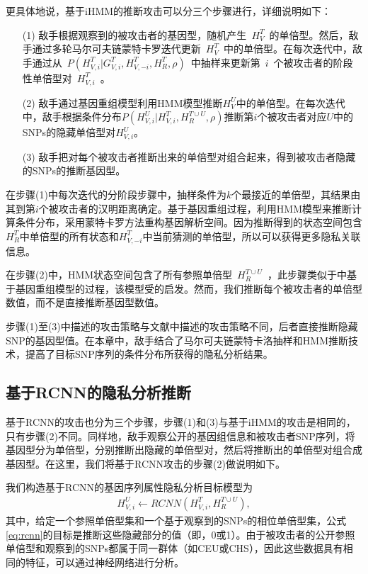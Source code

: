 更具体地说，基于iHMM的推断攻击可以分三个步骤进行，详细说明如下：
\begin{enumerate}
	\item[(1)] 敌手根据观察到的被攻击者的基因型，随机产生~$H_V^T$~的单倍型。然后，敌手通过多轮马尔可夫链蒙特卡罗迭代更新~$H_V^T$~中的单倍型。在每次迭代中，敌手通过从~$P(H_{V,i}^T|G_{V,i}^T,H_{V,-i}^T,H_R^T,\rho)$~中抽样来更新第~$i$~个被攻击者的阶段性单倍型对~$H_{V,i}^T$~。
	\item[(2)] 敌手通过基因重组模型利用HMM模型推断$H_V^U$中的单倍型。在每次迭代中，敌手根据条件分布$P(H_{V,i}^U|H_{V,i}^T, H_R^{T \cup U},\rho)$推断第$i$个被攻击者对应$U$中的SNPs的隐藏单倍型对$H_{V,i}^U$。 
	\item[(3)] 敌手把对每个被攻击者推断出来的单倍型对组合起来，得到被攻击者隐藏的SNPs的推断基因型。
\end{enumerate}

在步骤(1)中每次迭代的分阶段步骤中，抽样条件为$k$个最接近的单倍型，其结果由其到第$i$个被攻击者的汉明距离确定。基于基因重组过程，利用HMM模型来推断计算条件分布，采用蒙特卡罗方法重构基因解析空间。因为推断得到的状态空间包含$H_R^T$中单倍型的所有状态和$H_{V,-i}^T$中当前猜测的单倍型，所以可以获得更多隐私关联信息。

在步骤(2)中，HMM状态空间包含了所有参照单倍型~$H_R^{T \cup U}$~，此步骤类似于\cite{samani2015quantifying}中基于基因重组模型的过程，该模型受\cite{marchini2007new}的启发。然而，我们推断每个被攻击者的单倍型数值，而不是直接推断基因型数值。

步骤(1)至(3)中描述的攻击策略与文献\cite{samani2015quantifying}中描述的攻击策略不同，后者直接推断隐藏SNP的基因型值。在本章中，敌手结合了马尔可夫链蒙特卡洛抽样和HMM推断技术，提高了目标SNP序列的条件分布所获得的隐私分析结果。

\subsection{基于RCNN的隐私分析推断}

基于RCNN的攻击也分为三个步骤，步骤(1)和(3)与基于iHMM的攻击是相同的，只有步骤(2)不同。同样地，敌手观察公开的基因组信息和被攻击者SNP序列，将基因型分为单倍型，分别推断出隐藏的单倍型对，然后将推断出的单倍型对组合成基因型。在这里，我们将基于RCNN攻击的步骤(2)做说明如下。

我们构造基于RCNN的基因序列属性隐私分析目标模型为
\begin{align}\label{eq:rcnn}
H_{V,i}^U  \leftarrow RCNN(H_{V,i}^T, H_R^{T \cup U}),
\end{align}
其中，给定一个参照单倍型集和一个基于观察到的SNPs的相位单倍型集，公式\ref{eq:rcnn}的目标是推断这些隐藏部分的值（即，0或1）。由于被攻击者的公开参照单倍型和观察到的SNPs都属于同一群体（如CEU或CHS\cite{igsr2015which}），因此这些数据具有相同的特征，可以通过神经网络进行分析。

